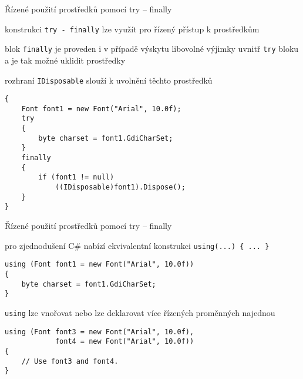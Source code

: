 \begin{frame}[fragile]
\begin{bitemize}{Řízené použití prostředků pomocí try -- finally}
\item konstrukci \lstinline|try - finally| lze využít pro řízený přístup k prostředkům
\item blok \lstinline|finally| je proveden i v případě výskytu libovolné výjimky uvnitř \lstinline|try| bloku a je tak možné uklidit prostředky
\item rozhraní \lstinline|IDisposable| slouží k uvolnění těchto prostředků
\end{bitemize}
\vfill
\begin{yesblock}
\begin{lstlisting}
{
    Font font1 = new Font("Arial", 10.0f);
    try
    {
        byte charset = font1.GdiCharSet;
    }
    finally
    {
        if (font1 != null)
            ((IDisposable)font1).Dispose();
    }
}
\end{lstlisting}
\end{yesblock}
\end{frame}


\begin{frame}[fragile]
\vfill
\begin{bitemize}{Řízené použití prostředků pomocí try -- finally}
\item pro zjednodušení C\# nabízí ekvivalentní konstrukci \lstinline|using(...) { ... }|
\end{bitemize}
\vfill
\begin{yesblock} 
\begin{lstlisting}
using (Font font1 = new Font("Arial", 10.0f))
{
    byte charset = font1.GdiCharSet;
}
\end{lstlisting}
\end{yesblock}
\vfill
\begin{bitemize}{}
\item \lstinline|using| lze vnořovat nebo lze deklarovat více řízených proměnných najednou
\end{bitemize}
\vfill
\begin{yesblock}
\begin{lstlisting}
using (Font font3 = new Font("Arial", 10.0f),
            font4 = new Font("Arial", 10.0f))
{
    // Use font3 and font4.
}
\end{lstlisting}
\end{yesblock}
\end{frame}


